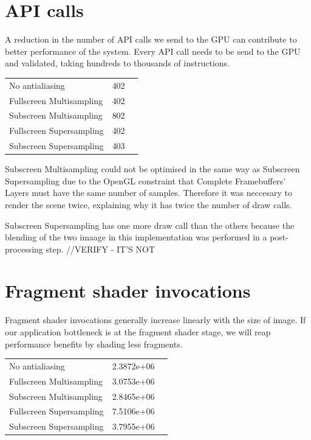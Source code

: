 \documentclass[12pt,a4paper,twoside,openright]{report}
\begin{document}
\section{API calls}

A reduction in the number of API calls we send to the GPU can contribute to better performance of the system. Every API call needs to be send to the GPU and validated, taking hundreds to thousands of instructions.

\begin{center}
\begin{tabular}{l|c|r}
No antialiasing      & 402 \\
Fullscreen Multisampling     & 402 \\
Subscreen Multisampling    &  802  \\
Fullscreen Supersampling      &  402   \\
Subscreen Supersampling    &  403  \\
\end{tabular}
\end{center}

Subscreen Multisampling could not be optimised in the same way as Subscreen Supersampling due to the OpenGL constraint that Complete Framebuffers' Layers must have the same number of samples. Therefore it was neccesary to render the scene twice, explaining why it has twice the number of draw calls.

Subscreen Supersampling has one more draw call than the others because the blending of the two imaage in this implementation was performed in a post-processing step. //VERIFY - IT'S NOT

\section{Fragment shader invocations}

Fragment shader invocations generally increase linearly with the size of image. If our application bottleneck is at the fragment shader stage, we will reap performance benefits by shading less fragments.

\begin{tabular}{l|c|r}
No antialiasing      & 2.3872e+06 \\
Fullscreen Multisampling     & 3.0753e+06 \\
Subscreen Multisampling    &  2.8465e+06  \\
Fullscreen Supersampling      &  7.5106e+06   \\
Subscreen Supersampling    &  3.7955e+06  \\
\end{tabular}
\end{document}
